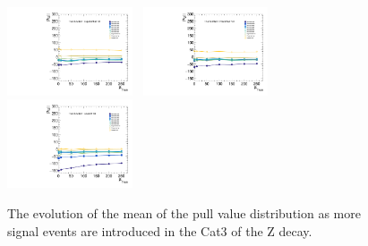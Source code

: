 \begin{figure}[!ht]
  \includegraphics[width=0.33\textwidth]{Fig/BiasStudy/Linearity/ZJpsiG_Cat3/pull_mean_linearity_TrueFunc6}~
  \includegraphics[width=0.33\textwidth]{Fig/BiasStudy/Linearity/ZJpsiG_Cat3/pull_mean_linearity_TrueFunc7}~
  \includegraphics[width=0.33\textwidth]{Fig/BiasStudy/Linearity/ZJpsiG_Cat3/pull_mean_linearity_TrueFunc8}\\
  \caption{The evolution of the mean of the pull value distribution as more signal events are introduced in the Cat3 of the Z decay.}
  \label{fig:Linearity_mean_ZJpsiG_Cat3}
\end{figure}
\clearpage
%
